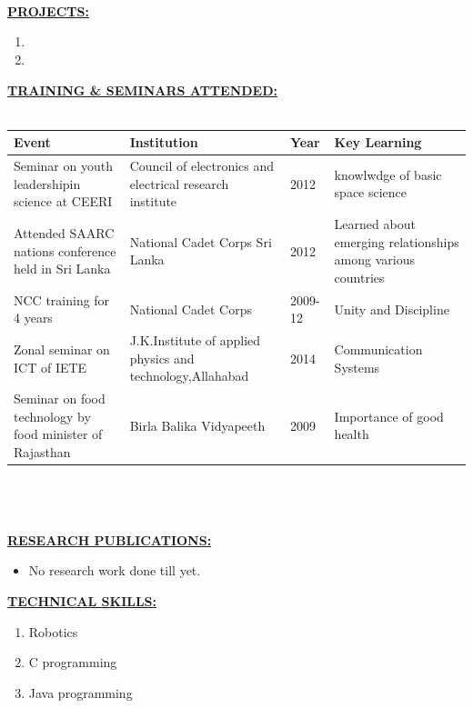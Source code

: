 \documentclass{article}
\begin{document}
			\\
			\\
			\\
			\underline{\textbf{PROJECTS:}}\\
			\begin{enumerate}
				\item 
				\item
			\end{enumerate}
			\underline{\textbf{TRAINING \& SEMINARS ATTENDED:}}\\
			\\
			\begin{tabular}{|p{4.5cm}|p{4.5cm}|p{2cm}|p{4cm}|}
				\hline
				\textbf{Event} & \textbf{Institution} & \textbf{Year} & \textbf{Key Learning}\\
				\hline
				Seminar on youth leadershipin science at CEERI & Council of electronics and electrical research institute & 2012 & knowlwdge of basic space science \\
				\hline
				Attended SAARC  nations conference held in Sri Lanka & National Cadet Corps Sri Lanka & 2012 & Learned about emerging relationships among various countries \\
				\hline
				NCC training for 4 years & National Cadet Corps & 2009-12 & Unity and Discipline \\
				\hline
				Zonal seminar on ICT of IETE & J.K.Institute of applied physics and technology,Allahabad & 2014 & Communication Systems\\
				\hline
				Seminar on food technology by food minister of Rajasthan & Birla Balika Vidyapeeth & 2009 & Importance of good health \\
				\hline
			\end{tabular}
				\\
				\\
				\\
				\underline{\textbf{RESEARCH PUBLICATIONS:}}\\
				\begin{itemize}
					\item No research work done till yet.
						\\[\baselineskip]
				\end{itemize}
				\underline{\textbf{TECHNICAL SKILLS:}}\\
				\begin{enumerate}
					\item Robotics
					\item C programming
					\item Java programming
				\end{enumerate}
\end{document}
